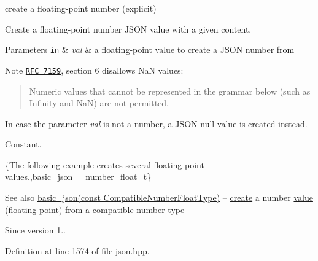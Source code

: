create a floating-\/point number (explicit) 

Create a floating-\/point number J\+S\+O\+N value with a given content.


\begin{DoxyParams}[1]{Parameters}
\mbox{\tt in}  & {\em val} & a floating-\/point value to create a J\+S\+O\+N number from\\
\hline
\end{DoxyParams}
\begin{DoxyNote}{Note}
\href{http://www.rfc-editor.org/rfc/rfc7159.txt}{\tt R\+F\+C 7159}, section 6 disallows Na\+N values\+: \begin{quote}
Numeric values that cannot be represented in the grammar below (such as Infinity and Na\+N) are not permitted. \end{quote}
In case the parameter {\itshape val} is not a number, a J\+S\+O\+N null value is created instead.
\end{DoxyNote}
Constant.

\{The following example creates several floating-\/point values.,basic\+\_\+json\+\_\+\+\_\+number\+\_\+float\+\_\+t\}

\begin{DoxySeeAlso}{See also}
\hyperlink{classnlohmann_1_1basic__json_a4bbdfd6dd8d2e6fc9ac5d81ef61ba3fe}{basic\+\_\+json(const Compatible\+Number\+Float\+Type)} -- \hyperlink{classnlohmann_1_1basic__json_a27df4303fbc83071275074486b54a40e}{create} a number \hyperlink{classnlohmann_1_1basic__json_a0a2cbbd95862a623e7dc5c37e67dead0}{value} (floating-\/point) from a compatible number \hyperlink{classnlohmann_1_1basic__json_a848cbae3bd3502ffbf738320bf5eb3aa}{type}
\end{DoxySeeAlso}
\begin{DoxySince}{Since}
version 1.. 
\end{DoxySince}


Definition at line 1574 of file json.\+hpp.

\hypertarget{classnlohmann_1_1basic__json_a4bbdfd6dd8d2e6fc9ac5d81ef61ba3fe}{}
